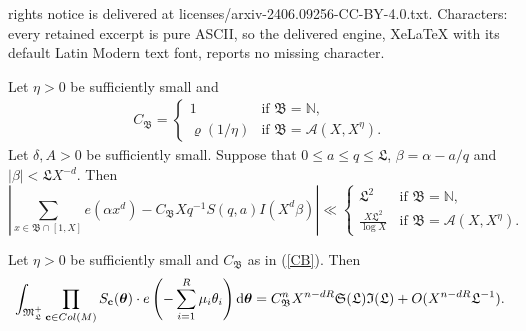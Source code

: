 \documentclass[10pt,a4paper]{amsart}
\let\mathcal\mathscr
\numberwithin{equation}{section}
\newcommand{\NN}{\mathbb{N}}
\newcommand{\btheta}{\boldsymbol{\theta}}
\renewcommand{\c}{\mathbf{c}}
\renewcommand{\leq}{\leqslant}
\begin{document}
rights notice is delivered at licenses/arxiv-2406.09256-CC-BY-4.0.txt. Characters: every retained excerpt is pure ASCII, so the delivered engine, XeLaTeX with its default Latin Modern text font, reports no missing character.
\begin{lemma}
\label{lem33}
Let $\eta > 0$ be sufficiently small and
\begin{eqnarray}
\label{CB}
C_\mathfrak{B} = \begin{cases}
                   1 & \mbox{if } \mathfrak{B} = \NN, \\
                   \varrho(1/\eta) & \mbox{if } \mathfrak{B} = \mathcal{A}(X, X^{\eta}).
                 \end{cases}
\end{eqnarray}
Let $\delta, A > 0$ be sufficiently small.
Suppose that $0 \leq a \leq q \leq \mathfrak{L}$, $\beta = \alpha - a/q$ and $|\beta| < \mathfrak{L} X^{-d}$.
Then
$$\left \vert
\sum_{ x \in \mathfrak{B} \cap [1, X]}  e(\alpha x^d) - C_{\mathfrak{B}} X q^{-1} S(q,a) I(X^d \beta) \right \vert \ll
\begin{cases}
\mathfrak L^2 \phantom{pp}   &\mbox{if } \mathfrak B = \mathbb N,\\
\frac{X \mathfrak L^2}{\log X} &\mbox{if }\mathfrak B = \mathcal{A}(X, X^\eta).
\end{cases}
$$
\end{lemma}

\begin{proposition}\label{lem:major}
Let $\eta > 0$ be sufficiently small and $C_\mathfrak{B}$ as in (\ref{CB}).
Then
\[
\int_{\mathfrak{M}_\mathfrak{L} ^+} \prod_{\c \in \textnormal{Col}(M)} S_\c(\btheta) \cdot  e\left(-\sum_{i = 1}^{R}\mu_i \theta_i  \right)\mathrm{d}\btheta
=
C_\mathfrak{B}^n  X^{n - d R} \mathfrak{S}( \mathfrak L) \mathfrak{I}(\mathfrak L) + O( X^{n  - d R} \mathfrak{L}^{- 1}).
\]
\end{proposition}
\end{document}
